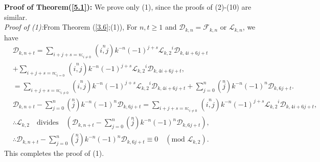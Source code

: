 \textbf{Proof of Theorem(\ref{5.1}):} We prove only (1), since the proofs of (2)-(10) are similar.\\
\textit{Proof of (1):}From Theorem (\ref{3.6};(1)), For $n, t\geq 1$ and $\mathcal{D}_{k,n}=\mathcal{F}_{k,n}$ or $\mathcal{L}_{k,n}$, we have
\begin{align*}
&\mathcal{D}_{k,n+t}=\sum\limits_{{i+j+s=n};_{i\neq 0}}\left( \stackrel{n}{i,j}\right) k^{-n}(-1)^{j+s}{\mathcal{L}_{k,2}}^i\mathcal{D}_{k,4i+6j+t}\\&+\sum\limits_{{i+j+s=n};_{i= 0}}\left( \stackrel{n}{i,j}\right) k^{-n}(-1)^{j+s}{\mathcal{L}_{k,2}}^i\mathcal{D}_{k,4i+6j+t},\\
&=\sum\limits_{{i+j+s=n};_{i\neq 0}}\left( \stackrel{n}{i,j}\right) k^{-n}(-1)^{j+s}{\mathcal{L}_{k,2}}^i\mathcal{D}_{k,4i+6j+t}+\sum\limits_{j=0}^{n}\left( \stackrel{n}{j}\right) k^{-n}(-1)^{n}\mathcal{D}_{k,6j+t}.\\
&\mathcal{D}_{k,n+t}-\sum\limits_{j=0}^{n}\left( \stackrel{n}{j}\right) k^{-n}(-1)^{n}\mathcal{D}_{k,6j+t}=\sum\limits_{{i+j+s=n};_{i\neq 0}}\left( \stackrel{n}{i,j}\right) k^{-n}(-1)^{j+s}{\mathcal{L}_{k,2}}^i\mathcal{D}_{k,4i+6j+t},\\
&\therefore \mathcal{L}_{k,2} \quad\text{divides}\quad(\mathcal{D}_{k,n+t}-\sum\limits_{j=0}^{n}\left( \stackrel{n}{j}\right) k^{-n}(-1)^{n}\mathcal{D}_{k,6j+t}),\\
&\therefore\mathcal{D}_{k,n+t}-\sum\limits_{j=0}^{n}\left( \stackrel{n}{j}\right) k^{-n}(-1)^{n}\mathcal{D}_{k,6j+t}\equiv 0\quad (\text{mod } \mathcal{L}_{k,2}).
\end{align*}
This completes the proof of (1).

